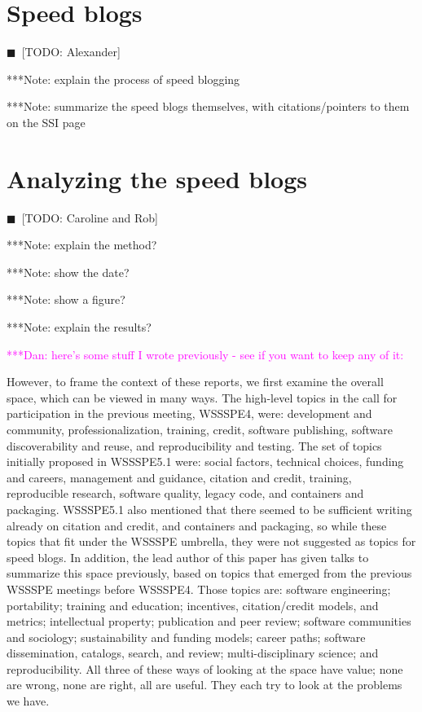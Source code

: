 \documentclass[11pt, oneside]{amsart}
\newcommand{\todo}[1]{{\color{blue}$\blacksquare$~\textsf{[TODO: #1]}}}
\newcommand{\note}[1]{ {\textcolor{blueish}    { ***Note:      #1 }}}
\newcommand{\katznote}[1]{ {\textcolor{magenta}    { ***Dan:      #1 }}}
\begin{document}
\section{Speed blogs} \label{sec:speed_blogs}

\todo{Alexander}

\note{explain the process of speed blogging}

\note{summarize the speed blogs themselves, with citations/pointers to them on the SSI page}


\section{Analyzing the speed blogs} \label{sec:speed_blog_analysis}

\todo{Caroline and Rob}

\note{explain the method?}

\note{show the date?}

\note{show a figure?}

\note{explain the results?}

\katznote{here's some stuff I wrote previously - see if you want to keep any of it:}

However, to frame the context of these reports, we first examine the overall space, which can be viewed in many ways.  The high-level topics in the call for participation in the previous meeting, WSSSPE4, were: development and community, professionalization, training, credit, software publishing, software discoverability and reuse, and reproducibility and testing. The set of topics initially proposed in WSSSPE5.1 were: social factors, technical choices, funding and careers, management and guidance, citation and credit, training, reproducible research, software quality, legacy code, and containers and packaging. WSSSPE5.1 also mentioned that there seemed to be sufficient writing already on citation and credit, and containers and packaging, so while these topics that fit under the WSSSPE umbrella, they were not suggested as topics for speed blogs. In addition, the lead author of this paper has given talks to summarize this space previously, based on topics that emerged from the previous WSSSPE meetings before WSSSPE4. Those topics are: software engineering; portability; training and education; incentives, citation/credit models, and metrics; intellectual property; publication and peer review; software communities and sociology; sustainability and funding models; career paths; software dissemination, catalogs, search, and review; multi-disciplinary science; and reproducibility. All three of these ways of looking at the space have value; none are wrong, none are right, all are useful. They each try to look at the problems we have.
\end{document}
